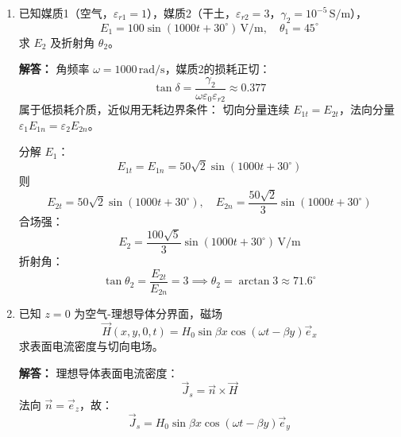 \begin{enumerate}[label=\arabic*.]
\textbf{解答：}
由法拉第定律 \(\nabla\times\vec{E}=-\mu_0\frac{\partial \vec{H}}{\partial t}\)：
\[
\nabla\times\vec{E} = -\frac{\partial E_z}{\partial y}\vec{e}_x = 40\pi\sin\left(\omega t-\frac{4}{3}y\right)\vec{e}_x
\]
\[
-\mu_0\frac{\partial \vec{H}}{\partial t} = 10\mu_0\omega\sin\left(\omega t-\frac{4}{3}y\right)\vec{e}_x
\]
比较得：
\[
40\pi = 10\mu_0\omega \implies \omega = \frac{4\pi}{\mu_0} = 10^7\,\text{rad/s}
\]

由安培环路定律 \(\nabla\times\vec{H}=\varepsilon_0\varepsilon_r\frac{\partial \vec{E}}{\partial t}\)：
\[
\nabla\times\vec{H} = -\frac{\partial H_x}{\partial y}\vec{e}_z = \frac{40}{3}\sin\left(\omega t-\frac{4}{3}y\right)\vec{e}_z
\]
\[
\varepsilon_0\varepsilon_r\frac{\partial \vec{E}}{\partial t} = -30\pi\omega\varepsilon_0\varepsilon_r\sin\left(\omega t-\frac{4}{3}y\right)\vec{e}_z
\]
比较得：
\[
\frac{40}{3} = 30\pi\omega\varepsilon_0\varepsilon_r
\]
代入 \(\omega=10^7\)，\(\varepsilon_0=8.854\times 10^{-12}\)：
\[
\varepsilon_r = \frac{40}{3\cdot 30\pi \cdot 10^7 \cdot 8.854\times 10^{-12}} \approx 16
\]

\vspace{1em}

\item 已知媒质1（空气，\(\varepsilon_{r1}=1\)），媒质2（干土，\(\varepsilon_{r2}=3\)，\(\gamma_2=10^{-5}\,\text{S/m}\)），
\[
E_1=100\sin(1000t+30^\circ)\,\text{V/m}, \quad \theta_1=45^\circ
\]
求 \(E_2\) 及折射角 \(\theta_2\)。

\textbf{解答：}
角频率 \(\omega=1000\,\text{rad/s}\)，媒质2的损耗正切：
\[
\tan\delta = \frac{\gamma_2}{\omega\varepsilon_0\varepsilon_{r2}} \approx 0.377
\]
属于低损耗介质，近似用无耗边界条件：
切向分量连续 \(E_{1t}=E_{2t}\)，法向分量 \(\varepsilon_1 E_{1n} = \varepsilon_2 E_{2n}\)。

分解 \(E_1\)：
\[
E_{1t} = E_{1n} = 50\sqrt{2}\sin(1000t+30^\circ)
\]
则
\[
E_{2t} = 50\sqrt{2}\sin(1000t+30^\circ),\quad
E_{2n} = \frac{50\sqrt{2}}{3}\sin(1000t+30^\circ)
\]
合场强：
\[
E_2 = \frac{100\sqrt{5}}{3}\sin(1000t+30^\circ)\,\text{V/m}
\]
折射角：
\[
\tan\theta_2 = \frac{E_{2t}}{E_{2n}} = 3 \implies \theta_2 = \arctan 3 \approx 71.6^\circ
\]

\vspace{1em}

\item 已知 \(z=0\) 为空气-理想导体分界面，磁场
\[
\vec{H}(x,y,0,t) = H_0\sin\beta x\cos(\omega t-\beta y)\vec{e}_x
\]
求表面电流密度与切向电场。

\textbf{解答：}
理想导体表面电流密度：
\[
\vec{J}_s = \vec{n}\times\vec{H}
\]
法向 \(\vec{n}=\vec{e}_z\)，故：
\[
\vec{J}_s = H_0\sin\beta x\cos(\omega t-\beta y)\vec{e}_y
\]


\end{enumerate}
